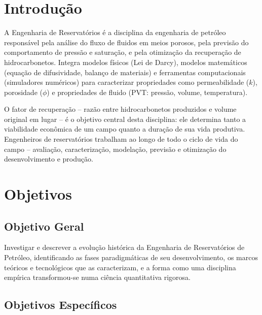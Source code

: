 \documentclass[12pt,a4paper,oneside,brazilian,sumario=tradicional]{abntex2}
\renewcommand{\contentsname}{\rmfamily\textbf{Sumário}}
\begin{document}
\pdfbookmark[0]{\contentsname}{toc}
\tableofcontents*
\cleardoublepage

\textual

\chapter{Introdução}

A Engenharia de Reservatórios é a disciplina da engenharia de petróleo responsável pela análise do fluxo de fluidos em meios porosos, pela previsão do comportamento de pressão e saturação, e pela otimização da recuperação de hidrocarbonetos. Integra modelos físicos (Lei de Darcy), modelos matemáticos (equação de difusividade, balanço de materiais) e ferramentas computacionais (simuladores numéricos) para caracterizar propriedades como permeabilidade ($k$), porosidade ($\phi$) e propriedades de fluido (PVT: pressão, volume, temperatura).

O fator de recuperação -- razão entre hidrocarbonetos produzidos e volume original em lugar -- é o objetivo central desta disciplina: ele determina tanto a viabilidade econômica de um campo quanto a duração de sua vida produtiva. Engenheiros de reservatórios trabalham ao longo de todo o ciclo de vida do campo -- avaliação, caracterização, modelação, previsão e otimização do desenvolvimento e produção.

\chapter{Objetivos}

\section{Objetivo Geral}

Investigar e descrever a evolução histórica da Engenharia de Reservatórios de Petróleo, identificando as fases paradigmáticas de seu desenvolvimento, os marcos teóricos e tecnológicos que as caracterizam, e a forma como uma disciplina empírica transformou-se numa ciência quantitativa rigorosa.

\section{Objetivos Específicos}
\end{document}
